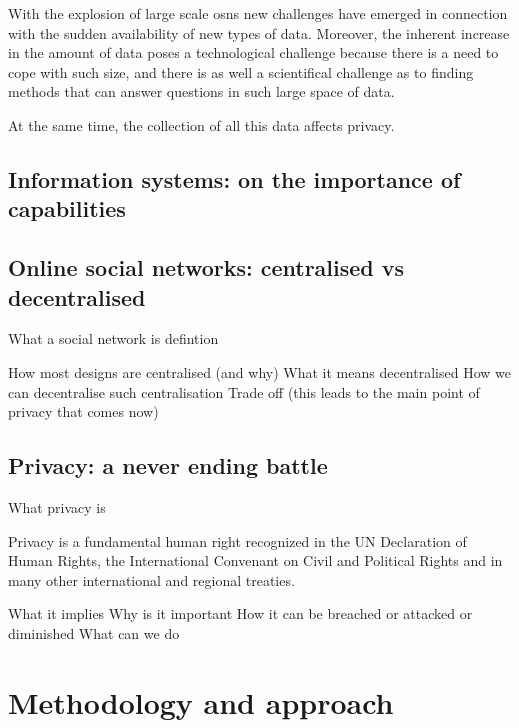 \documentclass[showtrims]{kthesis}
\begin{document}
With the explosion of large scale \acp{osn} new challenges have emerged in connection 
with the sudden availability of new types of data. Moreover, the inherent increase 
in the amount of data poses a technological challenge because there is a need to 
cope with such size, and there is as well a scientifical challenge as to finding 
methods that can answer questions in such large space of data. 

At the same time, the collection of all this data affects privacy.


\section{Information systems: on the importance of capabilities}


\section{Online social networks: centralised vs decentralised}

What a social network is
defintion

How most designs are centralised (and why)
What it means decentralised
How we can decentralise such centralisation
Trade off (this leads to the main point of privacy that comes now)

\section{Privacy: a never ending battle}

What privacy is

Privacy is a fundamental human right recognized in the UN Declaration of Human Rights, the International Convenant on Civil and Political Rights and in many other international and regional treaties.

What it implies
Why is it important
How it can be breached or attacked or diminished
What can we do

\chapter{Methodology and approach}
\end{document}
